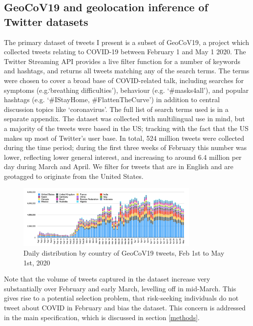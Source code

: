\documentclass{article}
\begin{document}
\subsection{GeoCoV19 and geolocation inference of Twitter datasets}\label{geocov}
The primary dataset of tweets I present is a subset of GeoCoV19, a project which collected tweets relating to COVID-19 between February 1 and May 1 2020. The Twitter Streaming API provides a live filter function for a number of keywords and hashtags, and returns all tweets matching any of the search terms. The terms were chosen to cover a broad base of COVID-related talk, including searches for symptoms (e.g.`breathing difficulties'), behaviour (e.g. `\#masks4all'), and popular hashtags (e.g. `\#IStayHome, \#FlattenTheCurve') in addition to central discussion topics like `coronavirus'. The full list of search terms used is in a separate appendix. The dataset was collected with multilingual use in mind, but a majority of the tweets were based in the US; tracking with the fact that the US makes up most of Twitter's user base. In total, 524 million tweets were collected during the time period; during the first three weeks of February this number was lower, reflecting lower general interest, and increasing to around 6.4 million per day during March and April. We filter for tweets that are in English and are geotagged to originate from the United States. 
\begin{figure}[h!]
    \includegraphics[width=0.8\textwidth]{figs/GeoCov-countrydistribution.png}    
    \centering
    \caption{Daily distribution by country of GeoCoV19 tweets, Feb 1st to May 1st, 2020 \parencite{qaziGeoCoV19DatasetHundreds2020a}}
\end{figure}
Note that the volume of tweets captured in the dataset increase very substantially over February and early March, levelling off in mid-March. This gives rise to a potential selection problem, that risk-seeking individuals do not tweet about COVID in February and bias the dataset. This concern is addressed in the main specification, which is discussed in section \ref{methods}.
\end{document}
